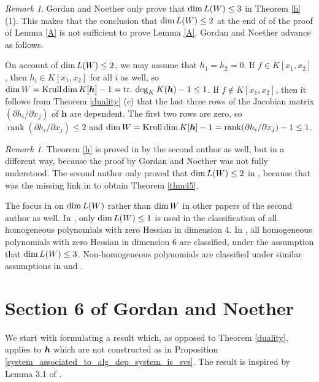 \documentclass[12pt]{article}
\theoremstyle{definition}
\theoremstyle{remark}
\newtheorem{remark}[theorem]{Remark}
\def\dim{{\rm dim}}
\def\boldh{\mbox{\boldmath $h$}}
\def\pa{\partial}
\def\rk{\operatorname{rank}}
\def\krdim{\operatorname{Krull\,dim}}
\def\trdeg{\operatorname{tr.\,deg}}
\begin{document}
\begin{remark}
Gordan and Noether only prove that $\dim\, L(W) \le 3$ in Theorem \ref{h} (1).
This makes that the conclusion that $\dim\, L(W) \le 2$ at the end of of the 
proof of Lemma \ref{A} is not sufficient to prove Lemma \ref{A}. 
Gordan and Noether advance as follows. 

On account of $\dim\, L(W) \le 2$, we may assume that $h_1 = h_2 = 0$. If 
$f \in K[x_1,x_2]$, then $h_i \in K[x_1,x_2]$ for all $i$ as well, so 
$\dim\, W = \krdim K[\bm{h}] - 1 = \trdeg_K K(\bm{h}) - 1 \le 1$.
If $f \notin K[x_1,x_2]$, then it follows from Theorem \ref{duality} (c) that
the last three rows of the Jacobian matrix $(\pa h_i/\pa x_j)$ of $\bm{h}$
are dependent. The first two rows are zero, so $\rk (\pa h_i / \pa x_j) \le 2$ 
and $\dim\, W = \krdim K[\bm{h}] - 1 = \rk (\pa h_i / \pa x_j)  - 1 \le 1$.
%
\end{remark}

\begin{remark} \label{linspanrem}
Theorem \ref{h} is proved in \cite{hmgqt5} by the second author as well, but in a 
different way, because the proof by Gordan and Noether was not fully understood.
The second author only proved that $\dim\, L(W) \le 2$ in \cite{hmgqt5}, because
that was the missing link in \cite{singhess} to obtain Theorem \ref{thm45}.

The focus in on $\dim\, L(W)$ rather than $\dim\, W$ in other papers of 
the second author as well.
In \cite{qtnsh}, only $\dim\, L(W) \le 1$ is used in the classification of all 
homogeneous polynomials with zero Hessian in dimension $4$. 
In \cite{hessmalrank}, all homogeneous polynomials with zero Hessian in 
dimension $6$ are classified, under the assumption that $\dim\, L(W) \le 3$.
Non-homogeneous polynomials are classified under similar assumptions in
\cite{singhess} and \cite{hessmalrank}.
%
\end{remark}

\section{Section 6 of Gordan and Noether~\cite{GNzzz}} 

We start with formulating a result which, as opposed to 
Theorem \ref{duality}, applies to $\boldh$ which are not constructed as in 
Proposition \ref{system_associated_to_alg_dep_system_is_svs}. 
The result is inspired by Lemma 3.1 of \cite{clossen}.
\end{document}

